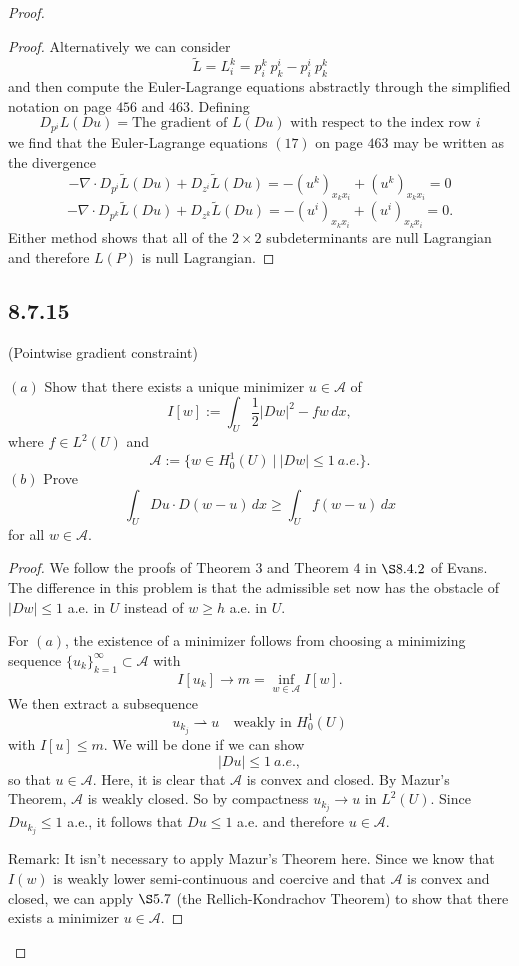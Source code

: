 \documentclass{article}
\begin{document}
\begin{flushleft}
\begin{proof}
\begin{proof}
Alternatively we can consider
$$\tilde{L}=L_i^k= p_i^k ~p_k^i - p_i^i~ p_k^k$$
and then compute the Euler-Lagrange equations abstractly through the simplified notation on page $456$ and $463$. Defining
$$D_{p^i}L(Du)= \text{The gradient of $L(Du)$ with respect to the index row $i$}$$
we find that the Euler-Lagrange equations $(17)$ on page $463$ may be written as the divergence
$$-\nabla\cdot D_{p^i}\tilde{L}(Du) + D_{z^i}\tilde{L}(Du)=-(u^k)_{x_k x_i}+(u^k)_{x_k x_i}=0$$
$$-\nabla\cdot D_{p^k}\tilde{L}(Du) + D_{z^k}\tilde{L}(Du)=-(u^i)_{x_k x_i}+(u^i)_{x_k x_i}=0.$$
Either method shows that all of the $2\times 2$ subdeterminants are null Lagrangian and therefore $L(P)$ is null Lagrangian.
\end{proof}

\subsection{\textbf{8.7.15}} (Pointwise gradient constraint)

$(a)$ Show that there exists a unique minimizer $u\in \mathcal{A}$ of
$$I[w]:=\int_U \frac{1}{2}|Dw|^2 - fw\,dx,$$
where $f\in L^2(U)$ and
$$\mathcal{A}:=\{w\in H_0^1(U)~|~|Dw|\le 1~a.e.\}.$$
$(b)$ Prove
$$\int_U Du\cdot D(w-u)\,dx \ge \int_U f(w-u)\,dx$$
for all $w\in\mathcal{A}$.
\begin{proof}
We follow the proofs of Theorem $3$ and Theorem $4$ in $\S 8.4.2$ of Evans. The difference in this problem is that the admissible set now has the obstacle of $|Dw|\le 1$ a.e. in $U$ instead of $w\ge h$ a.e. in $U$.

For $(a)$, the existence of a minimizer follows from 
choosing a minimizing sequence $\{u_k\}_{k=1}^{\infty}\subset \mathcal{A}$ with
$$I[u_k] \to m = \inf_{w\in\mathcal{A}}I[w].$$
We then extract a subsequence 
$$u_{k_j}\rightharpoonup u \quad \text{weakly in $H_0^1(U)$}$$
with $I[u]\leq m$. We will be done if we can show
$$|Du|\le 1~a.e.,$$
so that $u\in\mathcal{A}$. Here, it is clear that $\mathcal{A}$ is convex and closed. By Mazur's Theorem, $\mathcal{A}$ is weakly closed. So by compactness $u_{k_j}\to u$ in $L^2(U)$. Since $Du_{k_j}\le 1$ a.e., it follows that $Du\le 1$ a.e. and therefore $u\in\mathcal{A}$.

Remark: It isn't necessary to apply Mazur's Theorem here. Since we know that $I(w)$ is weakly lower semi-continuous and coercive and that $\mathcal{A}$ is convex and closed, we can apply $\S 5.7$ (the Rellich-Kondrachov Theorem) to show that there exists a minimizer $u\in\mathcal A$.


\end{proof}
\end{proof}
\end{flushleft}
\end{document}
